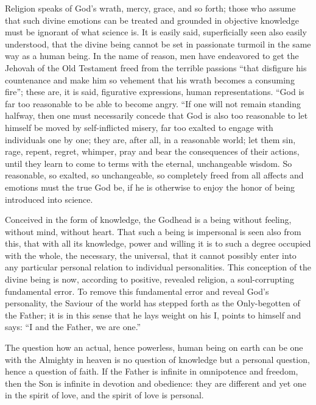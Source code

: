 \documentclass[12pt,a4paper,openany]{book}
\newcommand{\opage}[1]{\marginnote{\footnotesize\textit{[#1]}}}
\begin{document}
Religion speaks of God's wrath, mercy, grace, and so forth; those who assume that such divine
emotions can be treated and grounded in objective knowledge must be ignorant of what science is. It is
easily said, superficially seen also easily understood, that the divine being cannot be set in
passionate turmoil in the same way as a human being. In the name of reason, men have endeavored to
get the Jehovah of the Old Testament freed from the terrible passions ``that disfigure his countenance
and make him so vehement that his wrath becomes a consuming fire''; these are, it is said, figurative
expressions, human representations. ``God is far too reasonable to be able to become angry. ``If one
will not remain standing halfway, then one must necessarily concede that God is also too reasonable to
let himself be moved by self-inflicted misery, far too exalted to engage with individuals one by one;
they are, after all, in a reasonable world; let them sin, rage, repent, regret, whimper, pray and bear
the consequences of their actions, until they learn to come to terms with the eternal, unchangeable
wisdom. So reasonable, so exalted, so unchangeable, so completely freed from all affects and emotions
must the true God be, if he is otherwise to enjoy the honor of being introduced into science.

\setcounter{footnote}{0}%
\opage{74}Conceived in the form of knowledge, the Godhead is a being without feeling, without mind,
without heart. That such a being is impersonal is seen also from this, that with all its knowledge,
power and willing it is to such a degree occupied with the whole, the necessary, the universal, that it
cannot possibly enter into any particular personal relation to individual personalities. This
conception of the divine being is now, according to positive, revealed religion, a soul-corrupting
fundamental error. To remove this fundamental error and reveal God's personality, the Saviour of the
world has stepped forth as the Only-begotten of the Father; it is in this sense that he lays weight on
his I, points to himself and says: ``I and the Father, we are one.''

The question how an actual, hence powerless, human being on earth can be one with the Almighty in
heaven is no question of knowledge but a personal question, hence a question of faith. If the Father
is infinite in omnipotence and freedom, then the Son is infinite in devotion and obedience: they are
different and yet one in the spirit of love, and the spirit of love is personal.
\end{document}
